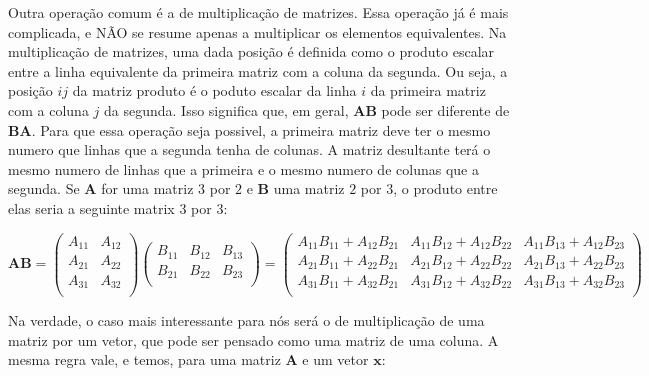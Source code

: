 \documentclass[portuges,]{tufte-handout}
\begin{document}
Outra operação comum é a de multiplicação de matrizes. Essa operação já
é mais complicada, e NÃO se resume apenas a multiplicar os elementos
equivalentes. Na multiplicação de matrizes, uma dada posição é definida
como o produto escalar entre a linha equivalente da primeira matriz com
a coluna da segunda. Ou seja, a posição \(ij\) da matriz produto é o
poduto escalar da linha \(i\) da primeira matriz com a coluna \(j\) da
segunda. Isso significa que, em geral, \(\mathbf{A}\mathbf{B}\) pode ser
diferente de \(\mathbf{B}\mathbf{A}\). Para que essa operação seja
possivel, a primeira matriz deve ter o mesmo numero que linhas que a
segunda tenha de colunas. A matriz desultante terá o mesmo numero de
linhas que a primeira e o mesmo numero de colunas que a segunda. Se
\(\mathbf{A}\) for uma matriz \(3\) por \(2\) e \(\mathbf{B}\) uma
matriz \(2\) por \(3\), o produto entre elas seria a seguinte matrix
\(3\) por \(3\):

\[
\mathbf{A}\mathbf{B} =
\left (
\begin{matrix}
A_{11} & A_{12} \\
A_{21} & A_{22}  \\
A_{31} & A_{32} \\
\end{matrix}
\right )
\left (
\begin{matrix}
B_{11} & B_{12} & B_{13} \\
B_{21} & B_{22} & B_{23} \\
\end{matrix}
\right )
=
\left (
\begin{smallmatrix}
A_{11}B_{11} +  A_{12}B_{21} & A_{11}B_{12} +  A_{12}B_{22} & A_{11}B_{13} +  A_{12}B_{23} \\
A_{21}B_{11} +  A_{22}B_{21} & A_{21}B_{12} +  A_{22}B_{22} & A_{21}B_{13} +  A_{22}B_{23} \\
A_{31}B_{11} +  A_{32}B_{21} & A_{31}B_{12} +  A_{32}B_{22} & A_{31}B_{13} +  A_{32}B_{23} \\
\end{smallmatrix}
\right )
\]

Na verdade, o caso mais interessante para nós será o de multiplicação de
uma matriz por um vetor, que pode ser pensado como uma matriz de uma
coluna. A mesma regra vale, e temos, para uma matriz \(\mathbf{A}\) e um
vetor \(\mathbf{x}\):
\end{document}
